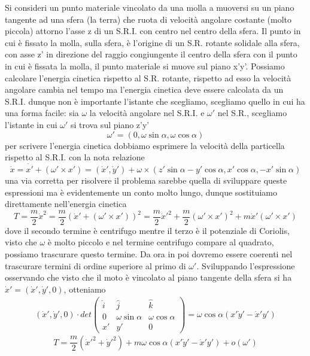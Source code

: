 \documentclass[
10pt, %
a4paper, %
oneside, %
headinclude,footinclude, %
BCOR5mm, %
]{scrartcl}
\begin{document}
\begin{esercizio}
	Si consideri un punto materiale vincolato da una molla a muoversi su un piano tangente ad una sfera (la terra) che ruota di velocità angolare costante (molto piccola) attorno l'asse z di un S.R.I. con centro nel centro della sfera. Il punto in cui è fissato la molla, sulla sfera, è l'origine di un S.R. rotante solidale alla sfera, con asse z' in direzione del raggio congiungente il centro della sfera con il punto in cui è fissata la molla, il punto materiale si muove sul piano x'y'. Possiamo calcolare l'energia cinetica rispetto al S.R. rotante, rispetto ad esso la velocità angolare cambia nel tempo ma l'energia cinetica deve essere calcolata da un S.R.I. dunque non è importante l'istante che scegliamo, scegliamo quello in cui ha una forma facile: sia \(\omega\) la velocità angolare nel S.R.I. e $\omega'$ nel S.R., scegliamo l'istante in cui $\omega '$ si trova sul piano z'y'
	\[\omega ' = (0, \omega\sin\alpha, \omega\cos\alpha)\]
	per scrivere l'energia cinetica dobbiamo esprimere la velocità della particella rispetto al S.R.I. con la nota relazione
	\[\dot{x} = \dot{x'}+(\omega '\times x') = (\dot{x}', \dot{y}')+\omega \times (z'\sin\alpha-y'\cos\alpha, x'\cos\alpha, -x'\sin\alpha)\]
	una via corretta per risolvere il problema sarebbe quella di sviluppare queste espressioni ma è evidentemente un conto molto lungo, dunque sostituiamo direttamente nell'energia cinetica
	\[T = \frac{m}{2}\dot{x}^2 = \frac{m}{2}(\dot{x}'+(\omega '\times x') )^2 =\frac{m}{2}\dot{x}'^2+\frac{m}{2}(\omega' \times x')^2+m\dot{x}'(\omega' \times x') \]
	dove il secondo termine è centrifugo mentre il terzo è il potenziale di Coriolis, visto che $\omega$ è molto piccolo e nel termine centrifugo compare al quadrato, possiamo trascurare questo termine. Da ora in poi dovremo essere coerenti nel trascurare termini di ordine superiore al primo di \(\omega '\). Sviluppando l'espressione osservando che visto che il moto è vincolato al piano tangente della sfera si ha \(\dot{x}' = (\dot{x}', \dot{y}', 0)\), otteniamo
	\begin{align*}
		(\dot{x}', \dot{y}', 0)\cdot
		det
		\begin{pmatrix}
			\hat{i}&\hat{j}&\hat{k}\\
			0&\omega\sin\alpha&\omega\cos\alpha\\
			x'&y'&0
		\end{pmatrix}=\omega\cos\alpha(x'\dot{y}'-\dot{x}'y')
	\end{align*}
	\[T = \frac{m}{2}(\dot{x}'^2+\dot{y}'^2) +m\omega \cos\alpha(x'\dot{y}'-\dot{x}'y')+o(\omega')\]

\end{esercizio}
\end{document}
